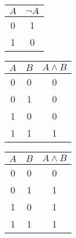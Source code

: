 { %
\captionsetup[table]{labelformat=empty, hypcap=false}

\begin{tcolorbox}[colframe=gray!80, colback=white, boxrule=0.4pt, top=4pt, bottom=4pt]
  \begin{minipage}[t]{0.32\textwidth}
    \centering
    \vspace{-10pt} %
    \vspace{10pt}  %
    \begin{tabular}{c c}
      \(A\) & \(\neg A\) \\
      \midrule
      0 & 1 \\
      1 & 0
    \end{tabular}
  \end{minipage}
  \hfill
  \begin{minipage}[t]{0.32\textwidth}
    \centering
    \vspace{-10pt}
    \vspace{3pt}
    \begin{tabular}{cc c}
      \(A\) & \(B\) & \(A \land B\)\\
      \midrule
      0 & 0 & 0 \\
      0 & 1 & 0 \\
      1 & 0 & 0 \\
      1 & 1 & 1 \\
    \end{tabular}
  \end{minipage}
  \hfill
  \begin{minipage}[t]{0.32\textwidth}
    \centering
    \vspace{-10pt}
    \vspace{3pt}
    \begin{tabular}{cc c}
      \(A\) & \(B\) & \(A \land B\)\\
      \midrule
      0 & 0 & 0 \\
      0 & 1 & 1 \\
      1 & 0 & 1 \\
      1 & 1 & 1 \\
    \end{tabular}
  \end{minipage}
\end{tcolorbox}

}
